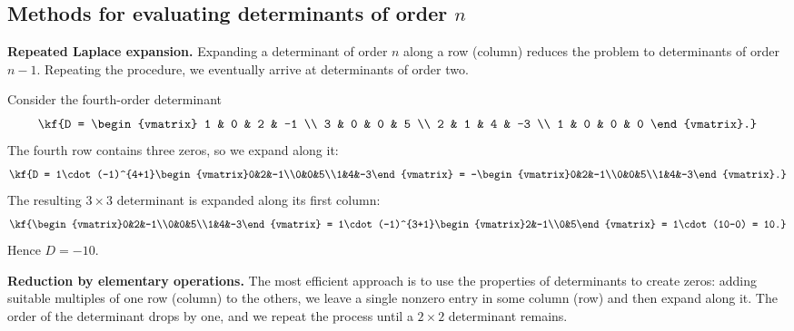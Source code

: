 \bigskip
\subsection{Methods for evaluating determinants of order \texorpdfstring{$n$}{n}}
\textbf{Repeated Laplace expansion.}
Expanding a determinant of order $n$ along a row (column) reduces the problem to
determinants of order $n-1$. Repeating the procedure, we eventually arrive at
determinants of order two.
\vspace{3pt}
\begin{misol}
Consider the fourth-order determinant
\[\kf{D = \begin{vmatrix}
1 & 0 & 2 & -1 \\
3 & 0 & 0 & 5 \\
2 & 1 & 4 & -3 \\
1 & 0 & 0 & 0
\end{vmatrix}.}\]
The fourth row contains three zeros, so we expand along it:
\[\kf{D = 1\cdot(-1)^{4+1}\begin{vmatrix}0&2&-1\\0&0&5\\1&4&-3\end{vmatrix}
= -\begin{vmatrix}0&2&-1\\0&0&5\\1&4&-3\end{vmatrix}.}\]
The resulting $3\times3$ determinant is expanded along its first column:
\[\kf{\begin{vmatrix}0&2&-1\\0&0&5\\1&4&-3\end{vmatrix}
= 1\cdot(-1)^{3+1}\begin{vmatrix}2&-1\\0&5\end{vmatrix}
= 1\cdot(10-0) = 10.}\]
Hence $D = -10$.
\end{misol}
\textbf{Reduction by elementary operations.}
The most efficient approach is to use the properties of determinants to create
zeros: adding suitable multiples of one row (column) to the others, we leave a
single nonzero entry in some column (row) and then expand along it. The order of
the determinant drops by one, and we repeat the process until a $2\times2$
determinant remains.
